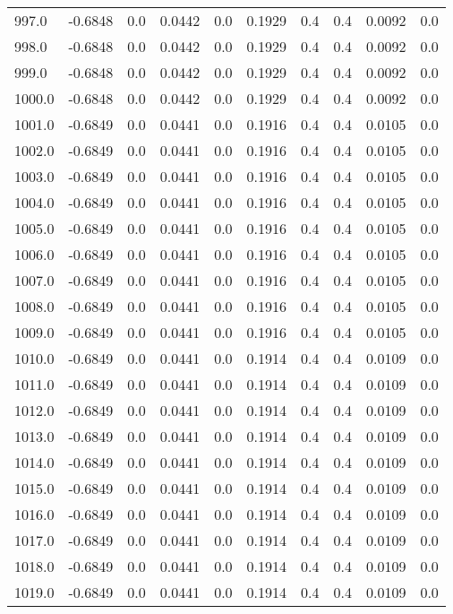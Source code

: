 \begin{longtable}{lrrrrrrrrr}
997.0 & -0.6848 & 0.0 & 0.0442 & 0.0 & 0.1929 & 0.4 & 0.4 & 0.0092 & 0.0 \\
998.0 & -0.6848 & 0.0 & 0.0442 & 0.0 & 0.1929 & 0.4 & 0.4 & 0.0092 & 0.0 \\
999.0 & -0.6848 & 0.0 & 0.0442 & 0.0 & 0.1929 & 0.4 & 0.4 & 0.0092 & 0.0 \\
1000.0 & -0.6848 & 0.0 & 0.0442 & 0.0 & 0.1929 & 0.4 & 0.4 & 0.0092 & 0.0 \\
1001.0 & -0.6849 & 0.0 & 0.0441 & 0.0 & 0.1916 & 0.4 & 0.4 & 0.0105 & 0.0 \\
1002.0 & -0.6849 & 0.0 & 0.0441 & 0.0 & 0.1916 & 0.4 & 0.4 & 0.0105 & 0.0 \\
1003.0 & -0.6849 & 0.0 & 0.0441 & 0.0 & 0.1916 & 0.4 & 0.4 & 0.0105 & 0.0 \\
1004.0 & -0.6849 & 0.0 & 0.0441 & 0.0 & 0.1916 & 0.4 & 0.4 & 0.0105 & 0.0 \\
1005.0 & -0.6849 & 0.0 & 0.0441 & 0.0 & 0.1916 & 0.4 & 0.4 & 0.0105 & 0.0 \\
1006.0 & -0.6849 & 0.0 & 0.0441 & 0.0 & 0.1916 & 0.4 & 0.4 & 0.0105 & 0.0 \\
1007.0 & -0.6849 & 0.0 & 0.0441 & 0.0 & 0.1916 & 0.4 & 0.4 & 0.0105 & 0.0 \\
1008.0 & -0.6849 & 0.0 & 0.0441 & 0.0 & 0.1916 & 0.4 & 0.4 & 0.0105 & 0.0 \\
1009.0 & -0.6849 & 0.0 & 0.0441 & 0.0 & 0.1916 & 0.4 & 0.4 & 0.0105 & 0.0 \\
1010.0 & -0.6849 & 0.0 & 0.0441 & 0.0 & 0.1914 & 0.4 & 0.4 & 0.0109 & 0.0 \\
1011.0 & -0.6849 & 0.0 & 0.0441 & 0.0 & 0.1914 & 0.4 & 0.4 & 0.0109 & 0.0 \\
1012.0 & -0.6849 & 0.0 & 0.0441 & 0.0 & 0.1914 & 0.4 & 0.4 & 0.0109 & 0.0 \\
1013.0 & -0.6849 & 0.0 & 0.0441 & 0.0 & 0.1914 & 0.4 & 0.4 & 0.0109 & 0.0 \\
1014.0 & -0.6849 & 0.0 & 0.0441 & 0.0 & 0.1914 & 0.4 & 0.4 & 0.0109 & 0.0 \\
1015.0 & -0.6849 & 0.0 & 0.0441 & 0.0 & 0.1914 & 0.4 & 0.4 & 0.0109 & 0.0 \\
1016.0 & -0.6849 & 0.0 & 0.0441 & 0.0 & 0.1914 & 0.4 & 0.4 & 0.0109 & 0.0 \\
1017.0 & -0.6849 & 0.0 & 0.0441 & 0.0 & 0.1914 & 0.4 & 0.4 & 0.0109 & 0.0 \\
1018.0 & -0.6849 & 0.0 & 0.0441 & 0.0 & 0.1914 & 0.4 & 0.4 & 0.0109 & 0.0 \\
1019.0 & -0.6849 & 0.0 & 0.0441 & 0.0 & 0.1914 & 0.4 & 0.4 & 0.0109 & 0.0 \\

\end{longtable}
